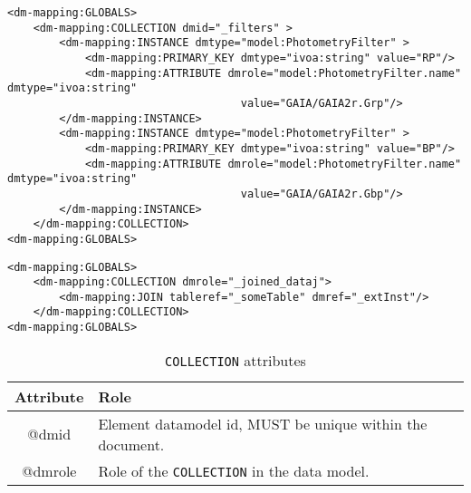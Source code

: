\begin{lstlisting}[frame=single,caption={Example of COLLECTION child of GLOBALS},style=XML,basicstyle=\tiny]
<dm-mapping:GLOBALS>
    <dm-mapping:COLLECTION dmid="_filters" >
        <dm-mapping:INSTANCE dmtype="model:PhotometryFilter" >
            <dm-mapping:PRIMARY_KEY dmtype="ivoa:string" value="RP"/>
            <dm-mapping:ATTRIBUTE dmrole="model:PhotometryFilter.name" dmtype="ivoa:string"
                                    value="GAIA/GAIA2r.Grp"/>
        </dm-mapping:INSTANCE>
        <dm-mapping:INSTANCE dmtype="model:PhotometryFilter" >
            <dm-mapping:PRIMARY_KEY dmtype="ivoa:string" value="BP"/>
            <dm-mapping:ATTRIBUTE dmrole="model:PhotometryFilter.name" dmtype="ivoa:string"
                                    value="GAIA/GAIA2r.Gbp"/>
        </dm-mapping:INSTANCE>
    </dm-mapping:COLLECTION>
<dm-mapping:GLOBALS>
\end{lstlisting}   

\begin{lstlisting}[frame=single,caption={Example of COLLECTION populated with a JOIN},style=XML,basicstyle=\tiny]
<dm-mapping:GLOBALS>
    <dm-mapping:COLLECTION dmrole="_joined_dataj">
        <dm-mapping:JOIN tableref="_someTable" dmref="_extInst"/>
    </dm-mapping:COLLECTION>
<dm-mapping:GLOBALS>
\end{lstlisting}   


\begin{table}[!htbp]
  \small
  \centering
  \begin{tabulary}{\linewidth}{|c|J|}       
    \hline 
         \textbf{Attribute} & 
         \textbf {Role}\\
    \hline
    \hline  
         @dmid & 
         Element datamodel id, MUST be unique within the document.\\
    \hline 
         @dmrole & 
         Role of the \texttt{COLLECTION} in the data model. \\
    \hline 
  \end{tabulary}
  \caption{\texttt{COLLECTION} attributes} 
  \label{tbl:collection-att}
 \end{table}

